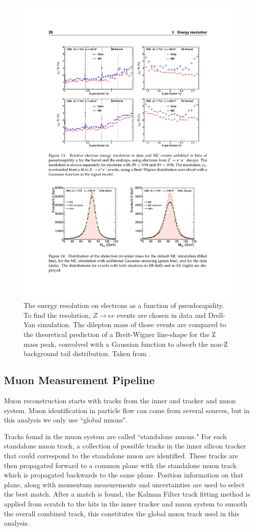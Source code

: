     \begin{figure}[h!]
      \centering
      \includegraphics[width=.7\textwidth]{figures/electron_E_resolution.pdf}
      \caption{The energy resolution on electrons as a function of pseudorapidity. To find the resolution, $Z\to ee$ events are chosen in data and Drell-Yan simulation. The dilepton mass of those events are compared to the theoretical prediction of a Breit-Wigner line-shape for the Z mass peak, convolved with a Gaussian function to absorb the non-Z background tail distribution. Taken from \cite{ecal_energy_reco}.}
      \label{fig:electron_E_resolution}
    \end{figure}

  \subsection{Muon Measurement Pipeline} \label{sec:muon_measurement_pipeline}
    Muon reconstruction starts with tracks from the inner and tracker and muon system. Muon identification in particle flow can come from several sources, but in this analysis we only use ``global muons". 

    Tracks found in the muon system are called ``standalone muons." For each standalone muon track, a collection of possible tracks in the inner silicon tracker that could correspond to the standalone muon are identified. These tracks are then propagated forward to a common plane with the standalone muon track which is propagated backwards to the same plane. Position information on that plane, along with momentum measurements and uncertainties are used to select the best match. \cite[sec 3]{cms_muons} \cite[sec 5.1]{muon_reco_AN} After a match is found, the Kalman Filter track fitting method is applied from scratch to the hits in the inner tracker and muon system to smooth the overall combined track, this constitutes the global muon track used in this analysis.

